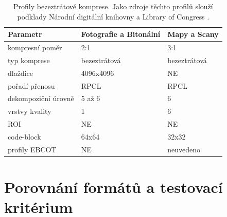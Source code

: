 \begin{table}[ht!]
\small
    \setlength{\tabcolsep}{3pt} %
    \renewcommand{\arraystretch}{1.5} %
    \begin{tabular}{|p{4.4cm}||p{5cm}|p{5cm}|}
      \hline
      \textbf{Parametr}             & \textbf{Fotografie a Bitonální}          & \textbf{Mapy a Scany} \\      
      \hline
      kompresní poměr               & 2:1                          & 3:1                \\ 
      typ komprese                  & bezeztrátová                 & bezeztrátová       \\ 
      dlaždice                      & 4096x4096                    & NE                 \\ 
      pořadí přenosu                & RPCL                         & RPCL               \\ 
      dekompoziční úrovně           & 5 až 6                       & 6                  \\ 
      vrstvy kvality                & 1                            & 6                  \\ 
      ROI                           & NE                           & NE                 \\ 
      code-block                    & 64x64                        & 32x32              \\ 
      profily EBCOT                 & NE                           & neuvedeno          \\ 
      \hline
    \end{tabular}
    \caption{Profily bezeztrátové komprese. Jako zdroje těchto profilů slouží podklady Národní digitální knihovny \cite{ndk} a Library of Congress \cite{cong}.} 
\end{table}


\newpage
\section{Porovnání formátů a testovací kritérium}

